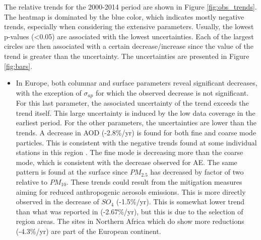 \documentclass[journal abbreviation, manuscript]{copernicus}
\begin{document}
The relative trends for the 2000-2014 period are shown in Figure \ref{fig:obs_trends}. The heatmap is dominated by the blue color, which indicates mostly negative trends, especially when considering the extensive parameters. Usually, the lowest p-values (<0.05) are associated with the lowest uncertainties. Each of the largest circles are then associated with a certain decrease/increase since the value of the trend is greater than the uncertainty. The uncertainties are presented in Figure \ref{fig:bars}.

\begin{itemize}
 \item In Europe, both columnar and surface parameters reveal significant decreases, with the exception of $\sigma_{ap}$ for which the observed decrease is not significant. For this last parameter, the associated uncertainty of the trend exceeds the trend itself. This large uncertainty is induced by the low data coverage in the earliest period. For the other parameters, the uncertainties are lower than the trends. A decrease in AOD (-2.8\%/yr) is found for both fine and coarse mode particles. This is consistent with the negative trends found at some individual stations in this region \citep{glantz2019}. The fine mode is decreasing more than the coarse mode, which is consistent with the decrease observed for AE. The same pattern is found at the surface since $PM_{2.5}$ has decreased by factor of two relative to $PM_{10}$. These trends could result from the mitigation measures aiming for reduced anthropogenic aerosols emissions. This is more directly observed in the decrease of $SO_{4}$ (-1.5\%/yr). This is somewhat lower trend than what was reported in \cite{aas2019global} (-2.67\%/yr), but this is due to the selection of region areas. The sites in Northern Africa which do show more reductions (-4.3\%/yr) are part of the European continent. 
 

\end{itemize}
\end{document}
